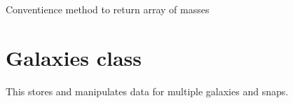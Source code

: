 \documentclass[letterpaper,10pt,english]{sphinxmanual}
\begin{document}
\begin{fulllineitems}
\begin{fulllineitems}
\end{fulllineitems}


\begin{fulllineitems}
\label{\detokenize{galaxy:galaxy.galaxy.Galaxy.m}}
Conventience method to return array of masses

\end{fulllineitems}


\end{fulllineitems}

\label{\detokenize{galaxies:module-galaxy.galaxies}}

\chapter{Galaxies class}
\label{\detokenize{galaxies:galaxies-class}}\label{\detokenize{galaxies::doc}}
This stores and manipulates data for multiple galaxies and snaps.
\end{document}
